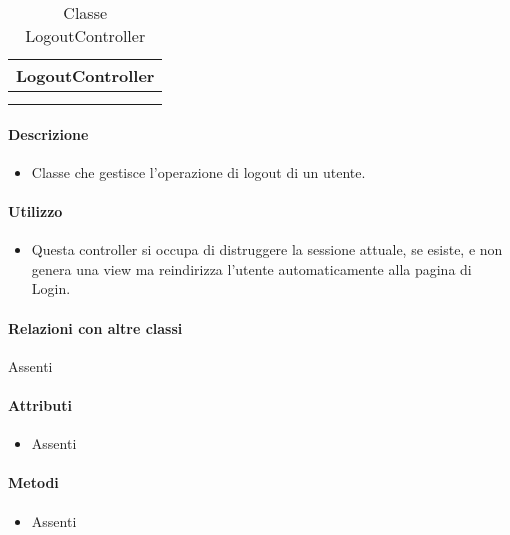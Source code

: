 \begin{table}[ht]
\begin{center}
\bgroup
\setlength{\arrayrulewidth}{0.6mm}
\def\arraystretch{1}
\begin{tabular}{ | p{12cm} | }
\hline
\centerline{\textbf{LogoutController}}
\\ \hline
 \\ 
\hline
 \\ 
\hline
\end{tabular}
\egroup
\caption{Classe LogoutController}
\end{center}
\end{table}

\paragraph*{Descrizione}
\begin{itemize}
\item[] Classe che gestisce l'operazione di logout di un utente.
\end{itemize}

\paragraph*{Utilizzo}
\begin{itemize}
\item[] Questa controller si occupa di distruggere la sessione attuale, se esiste, e non genera una view ma reindirizza l'utente automaticamente alla pagina di Login.
\end{itemize}

\paragraph*{Relazioni con altre classi}
Assenti

\paragraph*{Attributi}
\begin{itemize}
\item[] Assenti
\end{itemize}

\paragraph*{Metodi}
\begin{itemize}
\item[] Assenti
\end{itemize}

